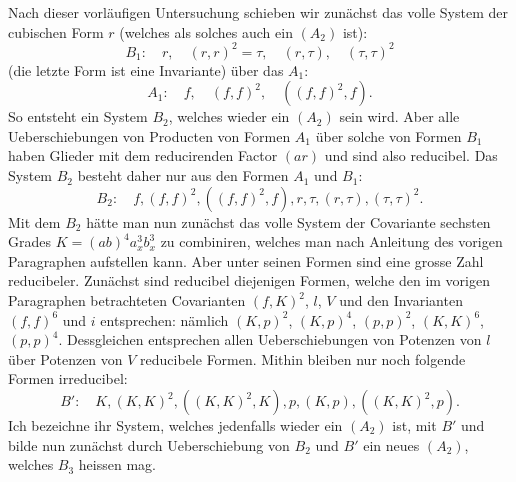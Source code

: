 \documentclass[10pt]{article}
\begin{document}
Nach dieser vorläufigen Untersuchung schieben wir zunächst das volle System der cubischen Form $r$ (welches als solches auch ein $(A_2)$ ist):
\[
B_1:
\quad r,
\quad (r,r)^2=\tau,
\quad (r,\tau),
\quad (\tau,\tau)^2
\]
(die letzte Form ist eine Invariante) über das $A_1$:
\[
A_1:
\quad f,
\quad (f,f)^2,
\quad ((f,f)^2,f).
\]
So entsteht ein System $B_2$, welches wieder ein $(A_2)$ sein wird. Aber alle Ueberschiebungen von Producten von Formen $A_1$ über solche von Formen $B_1$ haben Glieder mit dem reducirenden Factor $(ar)$ und sind also reducibel. Das System $B_2$ besteht daher nur aus den Formen $A_1$ und $B_1$:
\[
B_2:
\quad f,(f,f)^2,((f,f)^2,f),r,\tau,(r,\tau),(\tau,\tau)^2.
\]
Mit dem $B_2$ hätte man nun zunächst das volle System der Covariante sechsten Grades $K=(ab)^4a_x^3b_x^3$ zu combiniren, welches man nach Anleitung des vorigen Paragraphen aufstellen kann. Aber unter seinen Formen sind eine grosse Zahl reducibeler. Zunächst sind reducibel diejenigen Formen, welche den im vorigen Paragraphen betrachteten Covarianten $(f,K)^2$, $l$, $V$ und den Invarianten $(f,f)^6$ und $i$ entsprechen: nämlich $(K,p)^2$, $(K,p)^4$, $(p,p)^2$, $(K,K)^6$, $(p,p)^4$. Dessgleichen entsprechen allen Ueberschiebungen von Potenzen von $l$ über Potenzen von $V$ reducibele Formen. Mithin bleiben nur noch folgende Formen irreducibel:
\[
B':
\quad K,(K,K)^2,((K,K)^2,K),p,(K,p),((K,K)^2,p).
\]
Ich bezeichne ihr System, welches jedenfalls wieder ein $(A_2)$ ist, mit $B'$ und bilde nun zunächst durch Ueberschiebung von $B_2$ und $B'$ ein neues $(A_2)$, welches $B_3$ heissen mag.
\end{document}
